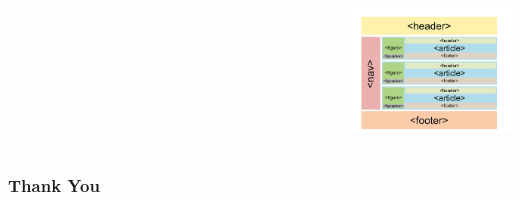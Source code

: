 \documentclass[aspectratio=169, table]{beamer}
\begin{document}
\begin{frame3}
		\vskip1cm
		\begin{tcolorbox}[standard jigsaw, opacityback=0, opacityframe=0, sharp corners, boxrule=0pt]
			\begin{columns}[T] %
				\begin{column}{0.5\textwidth}
					\textbf{\textcolor{white}{HTML elements are used to describe the structure and content of a web page. Each element has a specific purpose and can contain other elements or text. By combining different elements, you can create complex and interactive web pages.}}
				\end{column}
				\begin{column}{0.5\textwidth}
					\includegraphics[width=1\textwidth]{classFiles/html_structure.png}
				\end{column}
			\end{columns}
		\end{tcolorbox}
	\end{frame3}

\begin{frame4}
	\frametitle{Thank You}
\end{frame4}
\end{document}

